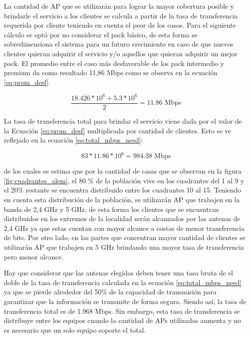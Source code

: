 \documentclass[11pt,a4paper]{article}
\begin{document}
La cantidad de AP que se utilizarán para lograr la mayor cobertura posible y brindarle el servicio a los clientes se calcula a partir de la tasa de transferencia requerida por cliente teniendo en cuenta el peor de los casos.
Para el siguiente cálculo se optó por no considerar el pack básico, de esta forma se sobredimensiona el sistema para un futuro crecimiento en caso de que nuevos clientes quieran adquirir el servicio y/o aquellos que quieran adquirir un mejor pack. 
El promedio entre el caso más desfavorable de los pack intermedio y premium da como resultado 11,86 Mbps como se observa en la ecuación \ref{eq:prom_desf}. 

\begin{equation}
  \frac{18.426*{10}^6+5.3*{10}^6}{2}=11.86 \text{ Mbps}
  \label{eq:prom_desf}
\end{equation}

La tasa de transferencia total para brindar el servicio viene dada por el valor de la Ecuación \ref{eq:prom_desf} multiplicada por cantidad de clientes. Esto se ve reflejado en la ecuación \ref{eq:total_mbps_need}:

\begin{equation}
  83 * 11.86*{10}^6 = 984.38 \text{ Mbps}
  \label{eq:total_mbps_need}
\end{equation}

de los cuales se estima que por la cantidad de casas que se observan en la figura \ref{fig:cuadrantes_alem}, el 80 \% de la población vive en los cuadrantes del 1 al 9 y el 20\% restante se encuentra distribuido entre los cuadrantes 10 al 15. 
Teniendo en cuenta esta distribución de la población, se utilizarán AP que trabajen en la banda de 2,4 GHz y 5 GHz, de esta forma los clientes que se encuentran distribuidos en los extremos de la localidad serán alcanzados por las antenas de 2,4 GHz ya que estas cuentan con mayor alcance a costas de menor transferencia de bits. 
Por otro lado, en las partes que concentran mayor cantidad de clientes se utilizarán AP que trabajen en 5 GHz brindando una mayor tasa de transferencia pero menor alcance.

Hay que considerar que las antenas elegidas deben tener una tasa bruta de el doble de la tasa de transferencia calculada en la ecuación \ref{eq:total_mbps_need} ya que se pierde alrededor del 50\% de la capacidad de transmisión para garantizar que  la información se transmite de forma segura. 
Siendo así, la tasa de transferencia total es de 1.968 Mbps. 
Sin embargo, esta tasa de transferencia se distribuye entre los equipos cuando la cantidad de APs utilizadas aumenta y no es necesario que un solo equipo soporte el total. 
\end{document}
